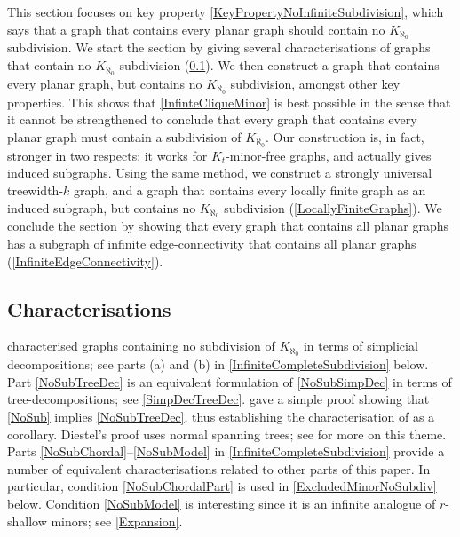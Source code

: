 \documentclass[a4paper,11pt]{article}
\theoremstyle{plain}
\theoremstyle{definition}
\begin{document}
This section focuses on key property \cref{KeyPropertyNoInfiniteSubdivision}, which says that a graph that contains every planar graph should contain no $K_{\aleph_0}$ subdivision. We start the section by giving several characterisations of graphs that contain no $K_{\aleph_0}$ subdivision (\cref{NoInfiniteSubdivisionCharacterisation}). We then construct a graph that contains every planar graph, but contains no $K_{\aleph_0}$ subdivision, amongst other key properties. This shows that \cref{InfinteCliqueMinor} is best possible in the sense that it cannot be strengthened to conclude that every graph that contains every planar graph must contain a subdivision of $K_{\aleph_0}$. Our construction is, in fact, stronger in two respects: it works for $K_t$-minor-free graphs, and actually gives induced subgraphs. Using the same method, we construct a strongly universal treewidth-$k$ graph, and a graph that contains every locally finite graph as an induced subgraph, but contains no $K_{\aleph_0}$ subdivision (\cref{LocallyFiniteGraphs}). We conclude the section by showing that every graph that contains all planar graphs has a subgraph of infinite edge-connectivity that contains all planar graphs (\cref{InfiniteEdgeConnectivity}). 

\subsection{Characterisations}
\label{NoInfiniteSubdivisionCharacterisation}

\citet{RST-TAMS92} characterised graphs containing no subdivision of $K_{\aleph_0}$ in terms of simplicial decompositions; see parts (a) and (b) in \cref{InfiniteCompleteSubdivision} below. Part \cref{NoSubTreeDec} is an equivalent formulation of \cref{NoSubSimpDec} in terms of tree-decompositions; see \cref{SimpDecTreeDec}. \citet{Diestel94} gave a simple proof showing that \cref{NoSub} implies \cref{NoSubTreeDec}, thus establishing the characterisation of \citet{RST-TAMS92} as a corollary. Diestel's proof uses normal spanning trees; see  \citep{Jung69,BD94,Pitz20} for more on this theme. Parts \cref{NoSubChordal}--\cref{NoSubModel} in \cref{InfiniteCompleteSubdivision} provide a number of equivalent characterisations related to other parts of this paper. In particular, condition \cref{NoSubChordalPart} is used in \cref{ExcludedMinorNoSubdiv} below. Condition \cref{NoSubModel} is interesting since it is an infinite analogue of $r$-shallow minors; see \cref{Expansion}.
\end{document}
